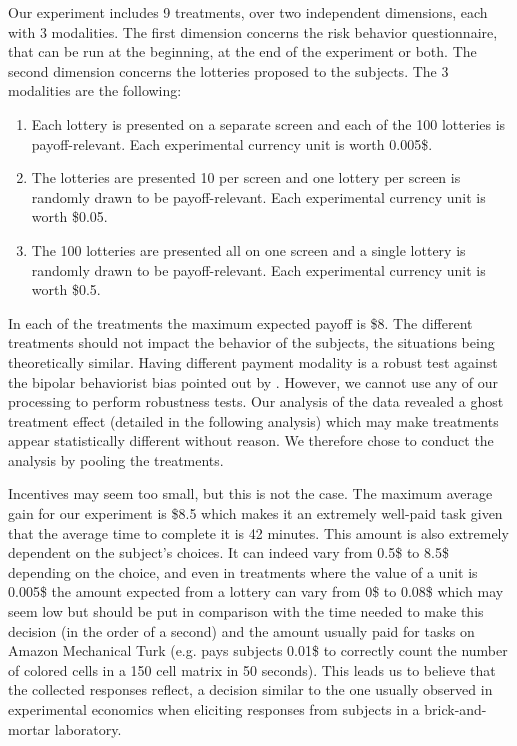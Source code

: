 \documentclass[
]{book}
\providecommand{\tightlist}{%
  \setlength{\itemsep}{0pt}\setlength{\parskip}{0pt}}
\begin{document}
Our experiment includes 9 treatments, over two independent dimensions, each with
3 modalities.
The first dimension concerns the risk behavior questionnaire, that can be run at
the beginning, at the end of the experiment or both.
The second dimension concerns the lotteries proposed to the subjects.
The 3 modalities are the following:

\begin{enumerate}
\def\labelenumi{\arabic{enumi}.}
\tightlist
\item
  Each lottery is presented on a separate screen and each of the 100
  lotteries is payoff-relevant.
  Each experimental currency unit is worth 0.005\$.
\item
  The lotteries are presented 10 per screen and one lottery per screen
  is randomly drawn to be payoff-relevant. Each experimental currency unit
  is worth \$0.05.
\item
  The 100 lotteries are presented all on one screen and a single lottery
  is randomly drawn to be payoff-relevant. Each experimental currency unit
  is worth \$0.5.
\end{enumerate}

In each of the treatments the maximum expected payoff is \$8.
The different treatments should not impact the behavior of the subjects, the
situations being theoretically similar.
Having different payment modality is a robust test against the bipolar
behaviorist bias pointed out by \citet{harrison2014experimental}.
However, we cannot use any of our processing to perform robustness tests.
Our analysis of the data revealed a ghost treatment effect (detailed in the
following analysis) which may make treatments appear statistically different
without reason.
We therefore chose to conduct the analysis by pooling the treatments.

Incentives may seem too small, but this is not the case.
The maximum average gain for our experiment is \$8.5 which
makes it an extremely well-paid task given that the average time to
complete it is 42
minutes.
This amount is also extremely dependent on the subject's choices.
It can indeed vary from 0.5\$ to 8.5\$ depending on the choice,
and even in treatments where the value of a unit is 0.005\$ the amount
expected from a lottery can vary from 0\$ to 0.08\$ which may seem low
but should be put in comparison with the time needed to make this
decision (in the order of a second) and the amount usually paid for
tasks on Amazon Mechanical Turk (e.g. \citet{sjaastad2021ulyssean} pays
subjects 0.01\$ to correctly count the number of colored cells in a 150
cell matrix in 50 seconds). This leads us to believe that the collected
responses reflect, a decision similar to the
one usually observed in experimental economics when eliciting
responses from subjects in a brick-and-mortar laboratory.
\end{document}
